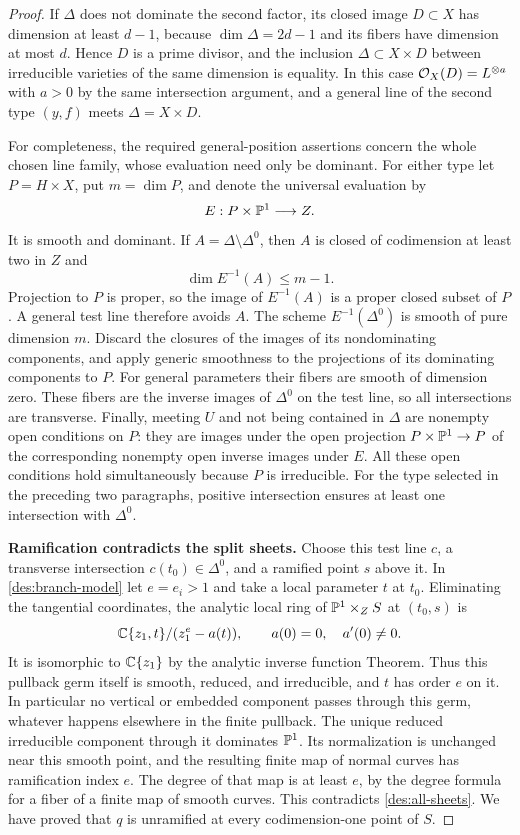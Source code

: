 \begin{proof}
If $\Delta$ does not dominate the second factor, its closed image
$D\subset X$ has dimension at least $d-1$, because
$\dim\Delta=2d-1$ and its fibers have dimension at most $d$.
Hence $D$ is a prime divisor, and the inclusion
$\Delta\subset X\times D$ between irreducible varieties of the
same dimension is equality. In this case $\mathcal O_X(D)=L^{\otimes a}$
with $a>0$ by the same intersection argument, and a general line of
the second type $(y,f)$ meets $\Delta=X\times D$.

For completeness, the required general-position assertions concern
the whole chosen line family, whose evaluation need only be dominant.
For either type let $P=H\times X$, put $m=\dim P$, and denote the
universal evaluation by
\[
E:P\times\mathbb P^1\longrightarrow Z.
\]
It is smooth and dominant. If $A=\Delta\setminus\Delta^0$, then
$A$ is closed of codimension at least two in $Z$ and
\[
\dim E^{-1}(A)\leq m-1.
\]
Projection to $P$ is proper, so the image of $E^{-1}(A)$ is a
proper closed subset of $P$. A general test line therefore avoids
$A$. The scheme $E^{-1}(\Delta^0)$ is smooth of pure dimension $m$.
Discard the closures of the images of its nondominating components,
and apply generic
smoothness to the projections of its dominating components to $P$.
For general parameters their fibers are smooth of dimension zero.
These fibers are the inverse images of $\Delta^0$ on the test line,
so all intersections are transverse. Finally, meeting $U$ and not
being contained in $\Delta$ are nonempty open conditions on $P$:
they are images under the open projection $P\times\mathbb P^1\to P$ of
the corresponding nonempty open inverse images under $E$.
All these open conditions hold simultaneously because $P$ is
irreducible. For the type selected in the preceding two paragraphs,
positive intersection ensures at least one intersection with
$\Delta^0$.

\medskip
\noindent\textbf{Ramification contradicts the split sheets.}
Choose this test line $c$, a transverse intersection $c(t_0)\in
\Delta^0$, and a ramified point $s$ above it. In
\eqref{des:branch-model} let $e=e_i>1$ and take a local parameter
$t$ at $t_0$. Eliminating the tangential coordinates, the analytic
local ring of $\mathbb P^1\times_ZS$ at $(t_0,s)$ is
\begin{equation}\label{des:pullback-germ}
\mathbb C\{z_1,t\}/(z_1^e-a(t)),\qquad
a(0)=0,\quad a'(0)\ne0.
\end{equation}
It is isomorphic to $\mathbb C\{z_1\}$ by the analytic inverse function
Theorem. Thus this pullback germ itself is smooth, reduced, and
irreducible, and $t$ has order $e$ on it. In particular no vertical
or embedded component passes through this germ, whatever happens
elsewhere in the finite pullback. The unique reduced irreducible
component through it dominates $\mathbb P^1$. Its normalization is
unchanged near this smooth point, and the resulting finite map of
normal curves has ramification index $e$. The degree of that map is
at least $e$, by the degree formula for a fiber of a finite map of
smooth curves. This contradicts \eqref{des:all-sheets}. We have proved
that $q$ is unramified at every codimension-one point of $S$.


\end{proof}
